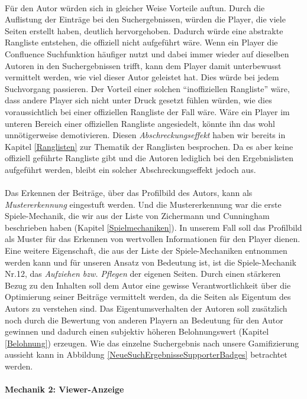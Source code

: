 \documentclass[a4paper,12pt,twoside]{scrartcl}
\begin{document}
\\
Für den Autor würden sich in gleicher Weise Vorteile auftun. Durch die Auflistung der Einträge bei den Suchergebnissen, würden die Player, die viele Seiten erstellt haben, deutlich hervorgehoben. Dadurch würde eine abstrakte Rangliste entstehen, die offiziell nicht aufgeführt wäre. Wenn ein Player die Confluence Suchfunktion häufiger nutzt und dabei immer wieder auf dieselben Autoren in den Suchergebnissen trifft, kann dem Player damit unterbewusst vermittelt werden, wie viel dieser Autor geleistet hat. Dies würde bei jedem Suchvorgang passieren. Der Vorteil einer solchen \enquote{inoffiziellen Rangliste} wäre, dass andere Player sich nicht unter Druck gesetzt fühlen würden, wie dies voraussichtlich bei einer offiziellen Rangliste der Fall wäre. Wäre ein Player im unteren Bereich einer offiziellen Rangliste angesiedelt, könnte ihn das wohl unnötigerweise demotivieren. Diesen \textit{Abschreckungseffekt} haben wir bereits in Kapitel \ref{Ranglisten} zur Thematik der Ranglisten besprochen. Da es aber keine offiziell geführte Rangliste gibt und die Autoren lediglich bei den Ergebnislisten aufgeführt werden, bleibt ein solcher Abschreckungseffekt jedoch aus.
\\\\
Das Erkennen der Beiträge, über das Profilbild des Autors, kann als \textit{Mustererkennung} eingestuft werden. Und die Mustererkennung war die erste Spiele-Mechanik, die wir aus der Liste von Zichermann und Cunningham beschrieben haben (Kapitel \ref{Spielmechaniken}). In unserem Fall soll das Profilbild als Muster für das Erkennen von wertvollen Informationen für den Player dienen. Eine weitere Eigenschaft, die aus der Liste der Spiele-Mechaniken entnommen werden kann und für unseren Ansatz von Bedeutung ist, ist die Spiele-Mechanik Nr.12, das \textit{Aufziehen bzw. Pflegen} der eigenen Seiten. Durch einen stärkeren Bezug zu den Inhalten soll dem Autor eine gewisse Verantwortlichkeit über die Optimierung seiner Beiträge vermittelt werden, da die Seiten als Eigentum des Autors zu verstehen sind. Das Eigentumsverhalten der Autoren soll zusätzlich noch durch die Bewertung von anderen Playern an Bedeutung für den Autor gewinnen und dadurch einen subjektiv höheren Belohnungswert (Kapitel \ref{Belohnung}) erzeugen. Wie das einzelne Suchergebnis nach unsere Gamifizierung aussieht kann in Abbildung \ref{NeueSuchErgebnisseSupporterBadges} betrachtet werden.
\\\\
\textbf{Mechanik 2: Viewer-Anzeige}\\
\end{document}
